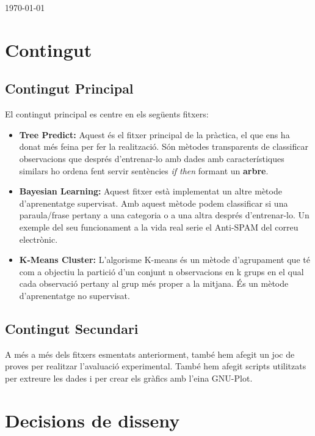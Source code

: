 \documentclass[11pt]{article}
\begin{document}
\begin{titlepage}
{\large \today}\\[3cm] %
\vfill %
\end{titlepage}
\newpage
\tableofcontents
\listoftables
\listoffigures
\clearpage
\newpage
\justify
\section{Contingut}
	\subsection{Contingut Principal}
		El contingut principal es centre en els següents fitxers:
		\begin{itemize}
\item \textbf{Tree Predict:} Aquest és el fitxer principal de la pràctica, el que ens ha donat més feina per fer la realització. Són mètodes transparents de classificar observacions que després d'entrenar-lo amb dades amb característiques similars ho ordena fent servir sentències \textit{if then} formant un \textbf{arbre}.
\item \textbf{Bayesian Learning:} Aquest fitxer està implementat un altre mètode d'aprenentatge supervisat. Amb aquest mètode podem classificar si una paraula/frase pertany a una categoria o a una altra després d'entrenar-lo. Un exemple del seu funcionament a la vida real serie el Anti-SPAM del correu electrònic.
\item \textbf{K-Means Cluster:} L'algorisme K-means és un mètode d'agrupament que té com a objectiu la partició d'un conjunt n observacions en k grups en el qual cada observació pertany al grup més proper a la mitjana. És un mètode d'aprenentatge no supervisat.
		\end{itemize}
	\subsection{Contingut Secundari}
		A més a més dels fitxers esmentats anteriorment, també hem afegit un joc de proves per realitzar l'avaluació experimental. També hem afegit scripts utilitzats per extreure les dades i per crear els gràfics amb l'eina GNU-Plot.
\newpage
\section{Decisions de disseny}
\end{document}
